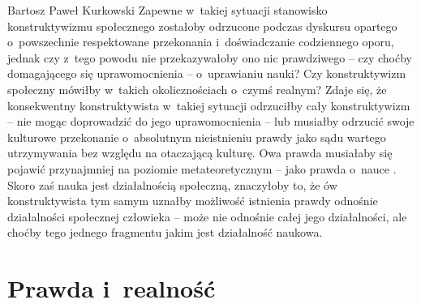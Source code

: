 \begin{artplenv}{Bartosz Paweł Kurkowski}
Zapewne w~takiej sytuacji stanowisko konstruktywizmu społecznego zostałoby odrzucone podczas dyskursu opartego o~powszechnie
respektowane przekonania i~doświadczanie codziennego oporu, jednak czy z~tego powodu nie przekazywałoby ono nic
prawdziwego -- czy choćby domagającego się uprawomocnienia -- o~uprawianiu nauki? Czy konstruktywizm społeczny
mówiłby w~takich okolicznościach o~czymś realnym? Zdaje się, że konsekwentny konstruktywista w~takiej sytuacji odrzuciłby cały
konstruktywizm -- nie mogąc doprowadzić do jego uprawomocnienia -- lub musiałby odrzucić swoje kulturowe
przekonanie o~absolutnym nieistnieniu prawdy jako sądu wartego utrzymywania bez względu na otaczającą kulturę. Owa prawda musiałaby
się pojawić przynajmniej na poziomie metateoretycznym -- jako prawda o~nauce
\parencite[s.~134]{hardt_studia_2013}.
Skoro zaś nauka jest działalnością społeczną, znaczyłoby to, że ów konstruktywista tym samym uznałby
możliwość istnienia prawdy odnośnie działalności społecznej człowieka -- może nie odnośnie całej jego działalności, ale
choćby tego jednego fragmentu jakim jest działalność naukowa.

\section{Prawda i~realność}


\end{artplenv}
